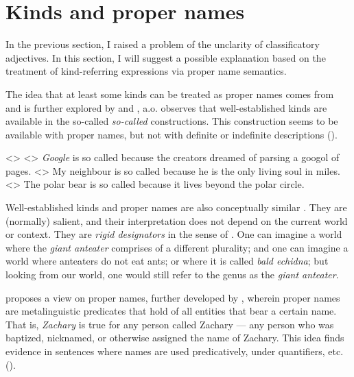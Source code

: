 \documentclass[a4paper, 12pt]{article}
\begin{document}
\section{Kinds and proper names}\label{pn}

In the previous section, I raised a problem of the unclarity of classificatory adjectives. In this section, I will suggest a possible explanation based on the treatment of kind-referring expressions via proper name semantics.

The idea that at least some kinds can be treated as proper names comes from \textcite{carlson1977referencekindsenglish} and is further explored by \textcite{heyer1985genericdescriptionsdefault} and \textcite{krifka1995genericityintroduction}, a.o.  observes that well-established kinds are available in the so-called \textit{so-called} constructions. This construction seems to be available with proper names, but not with definite or indefinite descriptions (\nextx).

\pex<>
    \a<> \textit{Google} is so called because the creators dreamed of parsing a googol of pages.
    \a<> \ljudge* My neighbour is so called because he is the only living soul in miles.
    \a<> The polar bear is so called because it lives beyond the polar circle.
\xe

Well-established kinds and proper names are also conceptually similar \parencite[65]{krifka1995genericityintroduction}. They are (normally) salient, and their interpretation does not depend on the current world or context. They are \emph{rigid designators} in the sense of \parencite{kripke1980namingnecessity}. One can imagine a world where the \textit{giant anteater} comprises of a different plurality; and one can imagine a world where anteaters do not eat ants; or where it is called \textit{bald echidna}; but looking from our world, one would still refer to the genus as the \textit{giant anteater}.

\textcite{burge1973referencepropernames} proposes a view on proper names, further developed by \parencite[a.m.o.]{elbourne2005situationsindividuals,maier2015referencebindingpresupposition}, wherein proper names are metalinguistic predicates that hold of all entities that bear a certain name. That is, \textit{Zachary} is true for any person called Zachary --- any person who was baptized, nicknamed, or otherwise assigned the name of Zachary. This idea finds evidence in sentences where names are used predicatively, under quantifiers, etc. (\nextx).
\end{document}
